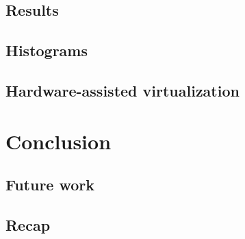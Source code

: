 \documentclass{beamer} %
\begin{document}
        \subsection{Results}
        

        \subsection{Histograms}
	

        \subsection{Hardware-assisted virtualization}
        

        \section{Conclusion}

        \subsection{Future work}
	

        \subsection{Recap}
	
\end{document}
